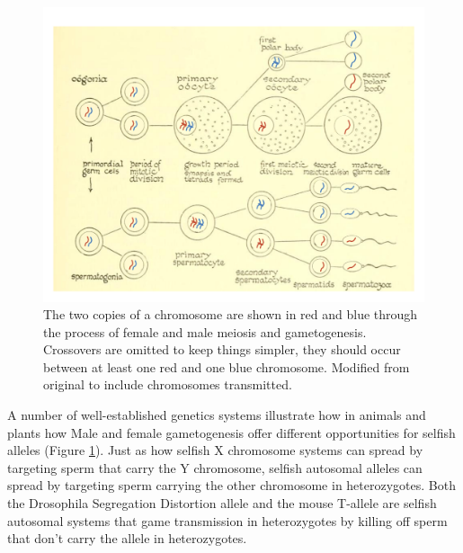 {  \begin{figure}
\begin{center}
\includegraphics[width= \textwidth]{illustration_images/single_locus_selection/gametogenesis_male_female/gametogenesis_w_chr.pdf}
\end{center}
\caption{
   The two copies of a chromosome are shown in red and blue through
   the process of female and male meiosis and gametogenesis.  Crossovers are omitted to keep things simpler, they should occur between
  at least one red and one blue chromosome. 
Modified from original to include chromosomes transmitted.
   } \label{fig:gametogenesis_male_female}
\end{figure}  %


A number of well-established genetics systems illustrate how in
animals and plants how Male and female gametogenesis offer different
opportunities for selfish alleles (Figure \ref{fig:gametogenesis_male_female}). Just as how selfish X chromosome systems can spread by
targeting sperm that carry the Y chromosome, selfish autosomal alleles
can spread by targeting sperm carrying the other chromosome in
heterozygotes. Both the Drosophila Segregation Distortion allele and
the mouse T-allele are selfish autosomal systems that
game transmission in heterozygotes by killing off sperm that don't carry the allele in heterozygotes.

}
